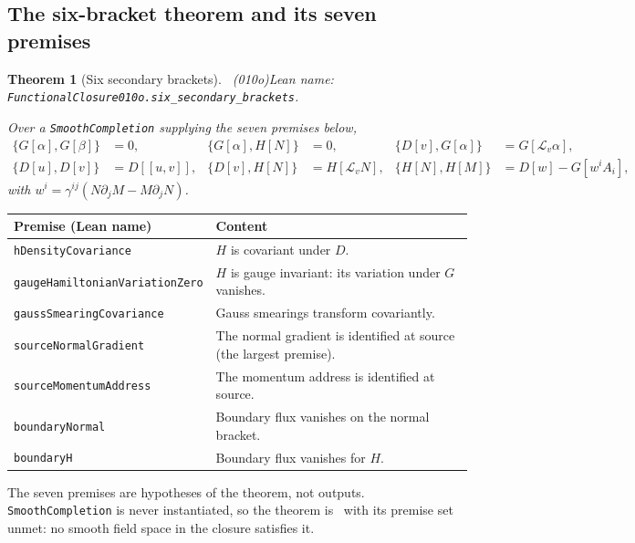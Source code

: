\documentclass[11pt,a4paper]{article}
\newcommand{\bs}[1]{\texttt{#1}}
\theoremstyle{plain}
\newtheorem{thm}{Theorem}[section]
\theoremstyle{definition}
\theoremstyle{remark}
\begin{document}
\subsection{The six-bracket theorem and its seven premises}\label{sec:six}
\begin{thm}[Six secondary brackets]\Scond\ \textit{(010o)}\label{thm:six}
\emph{Lean name:} \bs{FunctionalClosure010o.}\allowbreak\bs{six\_secondary\_brackets}.\par
Over a \bs{SmoothCompletion} supplying the seven premises below,
\begin{align*}
\{G[\alpha],G[\beta]\}&=0, & \{G[\alpha],H[N]\}&=0, & \{D[v],G[\alpha]\}&=G[\mathcal L_v\alpha],\\
\{D[u],D[v]\}&=D[[u,v]], & \{D[v],H[N]\}&=H[\mathcal L_vN], & \{H[N],H[M]\}&=D[w]-G[w^iA_i],
\end{align*}
with $w^i=\gamma^{ij}(N\partial_jM-M\partial_jN)$.
\end{thm}
\begin{center}\small
\begin{tabularx}{\linewidth}{@{}>{\raggedright\arraybackslash}p{5.5cm}>{\raggedright\arraybackslash}X@{}}
\toprule
Premise (Lean name) & Content\\\midrule
\bs{hDensityCovariance} & $H$ is covariant under $D$.\\
\bs{gaugeHamiltonianVariationZero} & $H$ is gauge invariant: its variation under $G$ vanishes.\\
\bs{gaussSmearingCovariance} & Gauss smearings transform covariantly.\\
\bs{sourceNormalGradient} & The normal gradient is identified at source (the largest premise).\\
\bs{sourceMomentumAddress} & The momentum address is identified at source.\\
\bs{boundaryNormal} & Boundary flux vanishes on the normal bracket.\\
\bs{boundaryH} & Boundary flux vanishes for $H$.\\\bottomrule
\end{tabularx}
\end{center}
The seven premises are hypotheses of the theorem, not outputs. \bs{SmoothCompletion} is never instantiated, so the theorem is \Scond\ with its premise set unmet: no smooth field space in the closure satisfies it.
\end{document}
